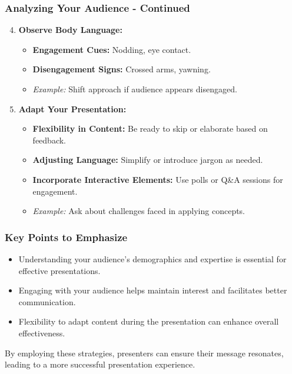 \documentclass{beamer}
\begin{document}
\begin{frame}[fragile]
    \frametitle{Analyzing Your Audience - Continued}
    \begin{enumerate}
        \setcounter{enumi}{3} %
        \item \textbf{Observe Body Language:}
            \begin{itemize}
                \item \textbf{Engagement Cues:} Nodding, eye contact.
                \item \textbf{Disengagement Signs:} Crossed arms, yawning.
                \item \textit{Example:} Shift approach if audience appears disengaged.
            \end{itemize}

        \item \textbf{Adapt Your Presentation:}
            \begin{itemize}
                \item \textbf{Flexibility in Content:} Be ready to skip or elaborate based on feedback.
                \item \textbf{Adjusting Language:} Simplify or introduce jargon as needed.
                \item \textbf{Incorporate Interactive Elements:} Use polls or Q&A sessions for engagement.
                \item \textit{Example:} Ask about challenges faced in applying concepts.
            \end{itemize}
    \end{enumerate}
\end{frame}

\begin{frame}[fragile]
    \frametitle{Key Points to Emphasize}
    \begin{itemize}
        \item Understanding your audience's demographics and expertise is essential for effective presentations.
        \item Engaging with your audience helps maintain interest and facilitates better communication.
        \item Flexibility to adapt content during the presentation can enhance overall effectiveness.
    \end{itemize}
    By employing these strategies, presenters can ensure their message resonates, leading to a more successful presentation experience.
\end{frame}
\end{document}
